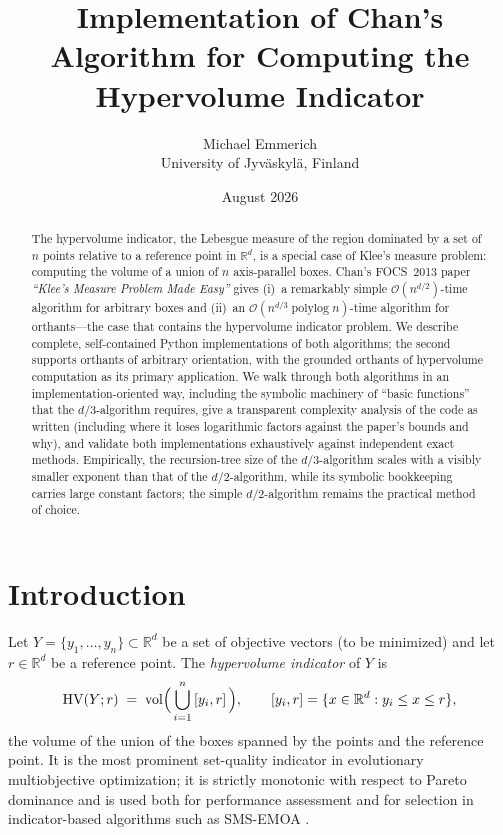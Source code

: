 \documentclass[11pt,a4paper]{article}
\title{Implementation of Chan's Algorithm for Computing the\\ Hypervolume Indicator}
\author{Michael Emmerich\\[2pt] \normalsize University of Jyv\"askyl\"a, Finland}
\date{August 2026}
\theoremstyle{remark}
\newcommand{\R}{\mathbb{R}}
\newcommand{\vol}{\operatorname{vol}}
\newcommand{\HV}{\operatorname{HV}}
\newcommand{\Oh}{\mathcal{O}}
\begin{document}
\maketitle

\begin{abstract}
The hypervolume indicator, the Lebesgue measure of the region dominated by a
set of $n$ points relative to a reference point in $\R^d$, is a special case of
Klee's measure problem: computing the volume of a union of $n$ axis-parallel
boxes.  Chan's FOCS~2013 paper \emph{``Klee's Measure Problem Made Easy''}
gives (i)~a remarkably simple $\Oh(n^{d/2})$-time algorithm for arbitrary
boxes and (ii)~an $\Oh(n^{d/3}\operatorname{polylog} n)$-time algorithm for
orthants---the case that contains the hypervolume indicator problem.  We
describe complete, self-contained Python implementations of both algorithms;
the second supports orthants of arbitrary orientation, with the grounded
orthants of hypervolume computation as its primary application.  We walk through both algorithms in an implementation-oriented
way, including the symbolic machinery of ``basic functions'' that the
$d/3$-algorithm requires, give a transparent complexity analysis of the code
as written (including where it loses logarithmic factors against the paper's
bounds and why), and validate both implementations exhaustively against
independent exact methods.  Empirically, the recursion-tree size of the
$d/3$-algorithm scales with a visibly smaller exponent than that of the
$d/2$-algorithm, while its symbolic bookkeeping carries large constant
factors; the simple $d/2$-algorithm remains the practical method of choice.
\end{abstract}

\section{Introduction}

Let $Y=\{y_1,\dots,y_n\}\subset\R^d$ be a set of objective vectors (to be
minimized) and let $r\in\R^d$ be a reference point.  The \emph{hypervolume
indicator} of $Y$ is
\begin{equation}
\HV(Y;r) \;=\; \vol\Bigl(\,\bigcup_{i=1}^{n}\,[y_i,r]\,\Bigr),
\qquad [y_i,r] = \{x\in\R^d : y_i \le x \le r\},
\label{eq:hv}
\end{equation}
the volume of the union of the boxes spanned by the points and the reference
point.  It is the most prominent set-quality indicator in evolutionary
multiobjective optimization; it is strictly monotonic with respect to Pareto
dominance and is used both for performance assessment and for selection in
indicator-based algorithms such as SMS-EMOA
\cite{ZitzlerThiele1999,BeumeNaujoksEmmerich2007,GuerreiroFonsecaPaquete2021}.
\end{document}
